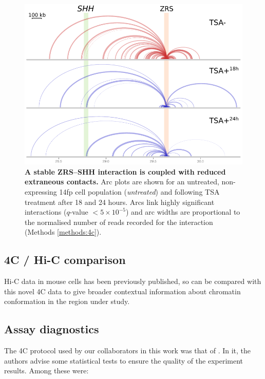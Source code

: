 \documentclass[a4paper,11pt,oneside]{book}
\begin{document}
\begin{figure}
\begin{center} 
\includegraphics[width=5in]{figs/4c_arcs.pdf}
\captionsetup{width=\textwidth} 
\caption[ A stable ZRS--SHH interaction is coupled with reduced extraneous contacts. ]{ {\bf A stable ZRS--SHH interaction is coupled with reduced extraneous contacts. }
Arc plots are shown for an untreated, non-expressing 14fp cell population (\emph{untreated}) and following TSA treatment after 18 and 24 hours. Arcs link highly significant interactions ($q$-value $< 5 \times 10^{-5}$) and arc widths are proportional to the normalised number of reads recorded for the interaction (Methods \ref{methods:4c}).
}\label{fig:4carcs}
\end{center} 
\end{figure} 

\subsection{4C / Hi-C comparison}

Hi-C data in mouse cells has been previously published,\cite{Dixon2012} so can be compared with this novel 4C data to give broader contextual information about chromatin conformation in the region under study.

\subsection{Assay diagnostics}

The 4C protocol used by our collaborators in this work was that of \citet{Stadhouders2013}. In it, the authors advise some statistical tests to ensure the quality of the experiment results. Among these were:\cite{Stadhouders2013}
\end{document}
